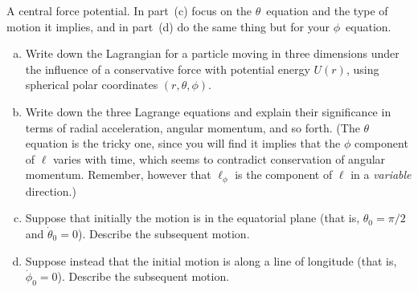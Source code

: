 \documentclass[11pt,letterpaper,boxed]{../hmcpset}
\begin{document}
\begin{problem}[iv] 
A central force potential. In part~(c) focus on the $\theta$~equation and the type of motion it implies, and in part~(d) do the same thing but for your $\phi$~equation. 

\begin{problem}[7.39]
\begin{enumerate}[(a)]
\item Write down the Lagrangian for a particle moving in three dimensions under the influence of a conservative force with potential energy $U(r)$, using spherical polar coordinates $(r, \theta, \phi)$. 

\item Write down the three Lagrange equations and explain their significance in terms of radial acceleration, angular momentum, and so forth. 
(The $\theta$ equation is the tricky one, since you will find it implies that the $\phi$ component of $\boldsymbol{\ell}$ varies with time, which seems to contradict conservation of angular momentum. 
Remember, however that $\ell_\phi$ is the component of $\boldsymbol{\ell}$ in a \textit{variable} direction.)

\item Suppose that initially the motion is in the equatorial plane (that is, $\theta_0 = \pi/2$ and ${\dot \theta}_0 = 0$). 
Describe the subsequent motion. 

\item Suppose instead that the initial motion is along a line of longitude (that is, ${\dot \phi}_0 = 0$). 
Describe the subsequent motion. 
\end{enumerate}
\end{problem}
\end{problem}

\begin{solution}
\vfill
\end{solution}

\newpage 
\end{document}
